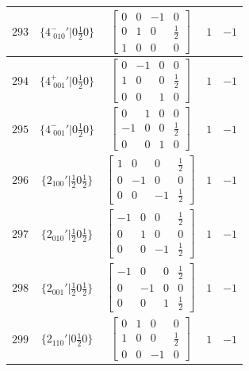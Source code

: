 \documentclass[fleqn,8pt]{jsarticle}
\begin{document}
\begin{longtable}{ccccc}
$ 293 $ & $ \{4^{-}_{\,\,010}{}'|0 \frac{1}{2} 0\} $ & $ \begin{bmatrix} 0 & 0 & -1 & 0 \\ 0 & 1 & 0 & \frac{1}{2} \\ 1 & 0 & 0 & 0 \end{bmatrix} $ & $ 1 $ & $ -1 $ \\ \hline
$ 294 $ & $ \{4^{+}_{\,\,001}{}'|0 \frac{1}{2} 0\} $ & $ \begin{bmatrix} 0 & -1 & 0 & 0 \\ 1 & 0 & 0 & \frac{1}{2} \\ 0 & 0 & 1 & 0 \end{bmatrix} $ & $ 1 $ & $ -1 $ \\ \hline
$ 295 $ & $ \{4^{-}_{\,\,001}{}'|0 \frac{1}{2} 0\} $ & $ \begin{bmatrix} 0 & 1 & 0 & 0 \\ -1 & 0 & 0 & \frac{1}{2} \\ 0 & 0 & 1 & 0 \end{bmatrix} $ & $ 1 $ & $ -1 $ \\ \hline
$ 296 $ & $ \{2{}_{100}{}'|\frac{1}{2} 0 \frac{1}{2}\} $ & $ \begin{bmatrix} 1 & 0 & 0 & \frac{1}{2} \\ 0 & -1 & 0 & 0 \\ 0 & 0 & -1 & \frac{1}{2} \end{bmatrix} $ & $ 1 $ & $ -1 $ \\ \hline
$ 297 $ & $ \{2{}_{010}{}'|\frac{1}{2} 0 \frac{1}{2}\} $ & $ \begin{bmatrix} -1 & 0 & 0 & \frac{1}{2} \\ 0 & 1 & 0 & 0 \\ 0 & 0 & -1 & \frac{1}{2} \end{bmatrix} $ & $ 1 $ & $ -1 $ \\ \hline
$ 298 $ & $ \{2{}_{001}{}'|\frac{1}{2} 0 \frac{1}{2}\} $ & $ \begin{bmatrix} -1 & 0 & 0 & \frac{1}{2} \\ 0 & -1 & 0 & 0 \\ 0 & 0 & 1 & \frac{1}{2} \end{bmatrix} $ & $ 1 $ & $ -1 $ \\ \hline
$ 299 $ & $ \{2{}_{110}{}'|0 \frac{1}{2} 0\} $ & $ \begin{bmatrix} 0 & 1 & 0 & 0 \\ 1 & 0 & 0 & \frac{1}{2} \\ 0 & 0 & -1 & 0 \end{bmatrix} $ & $ 1 $ & $ -1 $ \\ \hline

\end{longtable}
\end{document}
